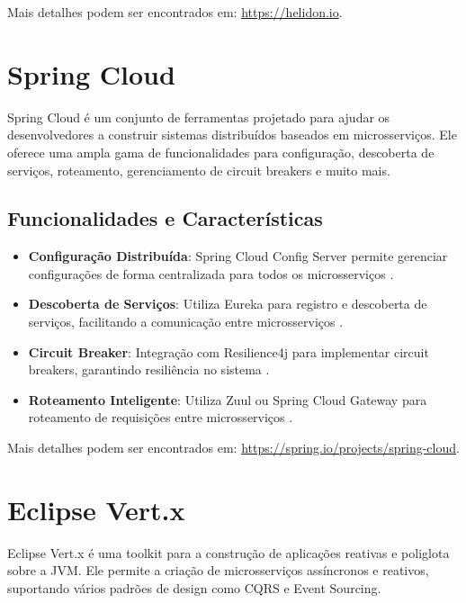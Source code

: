 Mais detalhes podem ser encontrados em: \url{https://helidon.io}.


\section{Spring Cloud}
Spring Cloud é um conjunto de ferramentas projetado para ajudar os desenvolvedores a construir sistemas distribuídos baseados em microsserviços. Ele oferece uma ampla gama de funcionalidades para configuração, descoberta de serviços, roteamento, gerenciamento de circuit breakers e muito mais.

\subsection{Funcionalidades e Características}
\begin{itemize}
    \item \textbf{Configuração Distribuída}: Spring Cloud Config Server permite gerenciar configurações de forma centralizada para todos os microsserviços \cite{SpringCloud2021}.
    \item \textbf{Descoberta de Serviços}: Utiliza Eureka para registro e descoberta de serviços, facilitando a comunicação entre microsserviços \cite{SpringCloud2021}.
    \item \textbf{Circuit Breaker}: Integração com Resilience4j para implementar circuit breakers, garantindo resiliência no sistema \cite{SpringCloud2021}.
    \item \textbf{Roteamento Inteligente}: Utiliza Zuul ou Spring Cloud Gateway para roteamento de requisições entre microsserviços \cite{SpringCloud2021}.
\end{itemize}

Mais detalhes podem ser encontrados em: \url{https://spring.io/projects/spring-cloud}.


\section{Eclipse Vert.x}
Eclipse Vert.x é uma toolkit para a construção de aplicações reativas e poliglota sobre a JVM. Ele permite a criação de microsserviços assíncronos e reativos, suportando vários padrões de design como CQRS e Event Sourcing.

